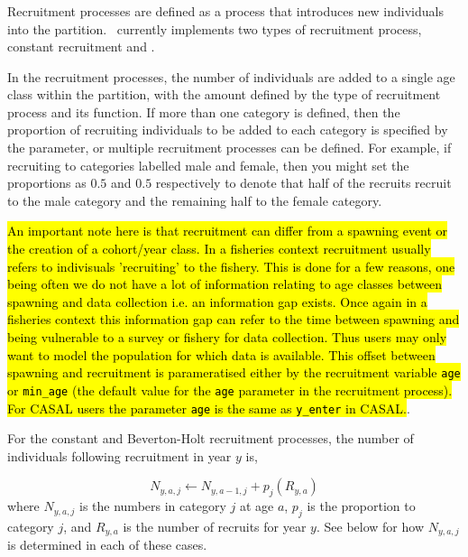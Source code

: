 \subsubsection{}

Recruitment processes are defined as a process that introduces new individuals into the partition. \CNAME\ currently implements two types of recruitment process, constant recruitment and   \citep{1203}.

In the recruitment processes, the number of individuals are added to a single age class within the partition, with the amount defined by the type of recruitment process and its function. If more than one category is defined, then the proportion of recruiting individuals to be added to each category is specified by the  parameter, or multiple recruitment processes can be defined. For example, if recruiting to categories labelled male and female, then you might set the proportions as $0.5$ and $0.5$ respectively to denote that half of the recruits recruit to the male category and the remaining half to the female category. 

\hl{An important note here is that recruitment can differ from a spawning event or the creation of a cohort/year class. In a fisheries context recruitment usually refers to indivisuals 'recruiting' to the fishery. This is done for a few reasons, one being often we do not have a lot of information relating to age classes between spawning and data collection i.e. an information gap exists. Once again in a fisheries context this information gap can refer to the time between spawning and being vulnerable to a survey or fishery for data collection. Thus users may only want to model the population for which data is available. This offset between spawning and recruitment is parameratised either by the recruitment variable \texttt{age} or \texttt{min\_age} (the default value for the \texttt{age} parameter in the recruitment process). For CASAL users the parameter \texttt{age} is the same as \texttt{y\_enter} in CASAL.}. 

For the constant and Beverton-Holt recruitment processes, the  number of individuals following recruitment in year $y$ is,  

\begin{equation}
N_{y,a,j} \leftarrow N_{y,a - 1,j} + p_j(R_{y,a})
\end{equation}
where $N_{y,a,j}$ is the numbers in category $j$ at age $a$, $p_j$ is the proportion to category $j$, and $R_{y,a}$ is the number of recruits for year $y$. See below for how $N_{y,a,j}$ is determined in each of these cases.


